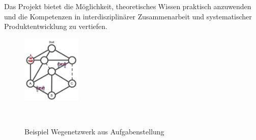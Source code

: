 \documentclass[main.tex]{subfiles} %
\begin{document}
Das Projekt bietet die Möglichkeit, theoretisches Wissen praktisch 
anzuwenden und die Kompetenzen in interdisziplinärer Zusammenarbeit 
und systematischer Produktentwicklung zu vertiefen.

\begin{figure}[H]
    \centering
    \includegraphics[width=0.25\textwidth]{Wegenetzwerk_Aufgabenstellung.pdf}
    \caption{Beispiel Wegenetzwerk aus Aufgabenstellung}~\label{fig:Wegenetzwerk_Aufgabenstellung}
\end{figure}
\end{document}
